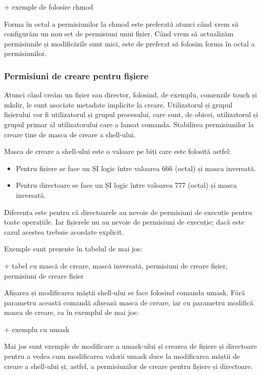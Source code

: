 + exemple de folosire chmod

Forma în octal a permisiunilor la chmod este preferată atunci când vrem să
configurăm un nou set de permisiuni unui fișier. Când vrem să actualizăm
permisiunile și modificările sunt mici, este de preferat să folosim forma în
octal a permisiunilor.

\subsubsection{Permisiuni de creare pentru fișiere}
\label{sec:users-fs-perms-umask}

Atunci când creăm un fișier sau director, folosind, de exemplu, comenzile touch
și mkdir, le sunt asociate metadate implicite la creare. Utilizatorul și grupul
fișierului vor fi utilizatorul și grupul procesului, care sunt, de obicei,
utilizatorul și grupul primar al utilizatorului care a lansat comanda.
Stabilirea permisiunilor la creare ține de masca de creare a shell-ului.

Masca de creare a shell-ului este o valoare pe biți care este folosită astfel:

\begin{itemize}
	\item Pentru fișiere se face un ȘI logic între valoarea 666 (octal) și
		masca inversată.
	\item Pentru directoare se face un ȘI logic între valoarea 777 (octal)
		și masca inversată.
\end{itemize}

Diferența este pentru că directoarele au nevoie de permisiuni de execuție pentru
toate operațiile. Iar fișierele nu au nevoie de permisiuni de execuție; dacă
este cazul acestea trebuie acordate explicit.

Exemple sunt prezente în tabelul de mai jos:

+ tabel cu mască de creare, mască inversată, permisiuni de creare fișier, permisiuni de creare fișier

Afișarea și modificarea măștii shell-ului se face folosind comanda umask. Fără
parametru această comandă afișează masca de creare, iar cu parametru modifică
masca de creare, ca în exemplul de mai jos:

+ exemplu cu umask

Mai jos sunt exemple de modificare a umask-ului și crearea de fișiere și
directoare pentru a vedea cum modificarea valorii umask duce la modificarea
măștii de creare a shell-ului și, astfel, a permisiunilor de creare pentru
fișiere și directoare.

